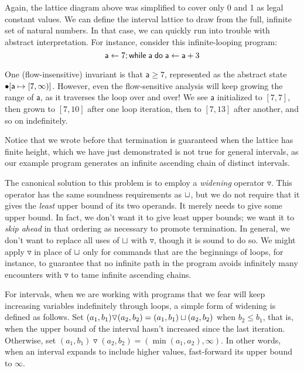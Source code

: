 \documentclass{amsbook}
\theoremstyle{definition}
\theoremstyle{remark}
\numberwithin{section}{chapter}
\numberwithin{equation}{chapter}
\begin{document}
Again, the lattice diagram above was simplified to cover only 0 and 1 as legal constant values.
We can define the interval lattice to draw from the full, infinite set of natural numbers.
In that case, we can quickly run into trouble with abstract interpretation.
For instance, consider this infinite-looping program:
$$\mathsf{a} \leftarrow 7; \mathsf{while} \; \mathsf{a} \; \mathsf{do} \; \mathsf{a} \leftarrow \mathsf{a} + 3$$

One (flow-insensitive) invariant is that $\mathsf{a} \geq 7$, represented as the abstract state $\bullet[\mathsf{a} \mapsto [7, \infty)]$.
However, even the flow-sensitive analysis will keep growing the range of $\mathsf{a}$, as it traverses the loop over and over!
We see $\mathsf{a}$ initialized to $[7, 7]$, then grown to $[7, 10]$ after one loop iteration, then to $[7, 13]$ after another, and so on indefinitely.

Notice that we wrote before that termination is guaranteed when the lattice has finite height, which we have just demonstrated is not true for general intervals, as our example program generates an infinite ascending chain of distinct intervals.

\newcommand{\widen}[0]{\triangledown}

The canonical solution to this problem is to employ a \emph{widening} operator $\widen$.
This operator has the same soundness requirements as $\sqcup$, but we do not require that it gives the \emph{least} upper bound of its two operands.
It merely needs to give some upper bound.
In fact, we don't want it to give least upper bounds; we want it to \emph{skip ahead} in that ordering as necessary to promote termination.
In general, we don't want to replace all uses of $\sqcup$ with $\widen$, though it is sound to do so.
We might apply $\widen$ in place of $\sqcup$ only for commands that are the beginnings of loops, for instance, to guarantee that no infinite path in the program avoids infinitely many encounters with $\widen$ to tame infinite ascending chains.

For intervals, when we are working with programs that we fear will keep increasing variables indefinitely through loops, a simple form of widening is defined as follows.
Set $(a_1, b_1) \widen (a_2, b_2) = (a_1, b_1) \join (a_2, b_2)$ when $b_2 \leq b_1$, that is, when the upper bound of the interval hasn't increased since the last iteration.
Otherwise, set $(a_1, b_1) \widen (a_2, b_2) = (\min(a_1, a_2), \infty)$.
In other words, when an interval expands to include higher values, fast-forward its upper bound to $\infty$.
\end{document}
